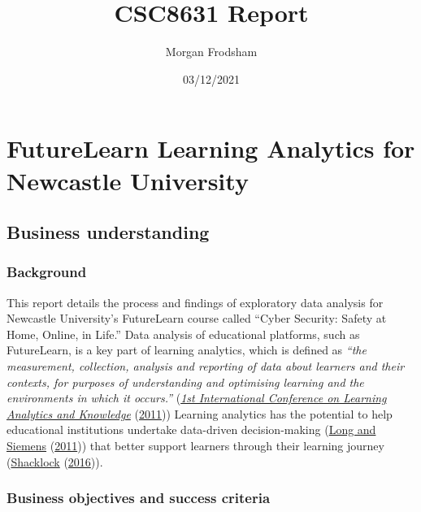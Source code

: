 \documentclass[
]{article}
\title{CSC8631 Report}
\author{Morgan Frodsham}
\date{03/12/2021}
\begin{document}
\maketitle

\hypertarget{futurelearn-learning-analytics-for-newcastle-university}{%
\section{FutureLearn Learning Analytics for Newcastle
University}\label{futurelearn-learning-analytics-for-newcastle-university}}

\hypertarget{business-understanding}{%
\subsection{Business understanding}\label{business-understanding}}

\hypertarget{background}{%
\subsubsection{Background}\label{background}}

This report details the process and findings of exploratory data
analysis for Newcastle University's FutureLearn course called ``Cyber
Security: Safety at Home, Online, in Life.'' Data analysis of
educational platforms, such as FutureLearn, is a key part of learning
analytics, which is defined as \emph{``the measurement, collection,
analysis and reporting of data about learners and their contexts, for
purposes of understanding and optimising learning and the environments
in which it occurs.''}
(\protect\hyperlink{ref-Learning-Analytics-Conference}{\emph{1st
International Conference on Learning Analytics and Knowledge}}
(\protect\hyperlink{ref-Learning-Analytics-Conference}{2011})) Learning
analytics has the potential to help educational institutions undertake
data-driven decision-making (\protect\hyperlink{ref-EDUCAUSE}{Long and
Siemens} (\protect\hyperlink{ref-EDUCAUSE}{2011})) that better support
learners through their learning journey
(\protect\hyperlink{ref-Bricks}{Shacklock}
(\protect\hyperlink{ref-Bricks}{2016})).

\hypertarget{business-objectives-and-success-criteria}{%
\subsubsection{Business objectives and success
criteria}\label{business-objectives-and-success-criteria}}
\end{document}
